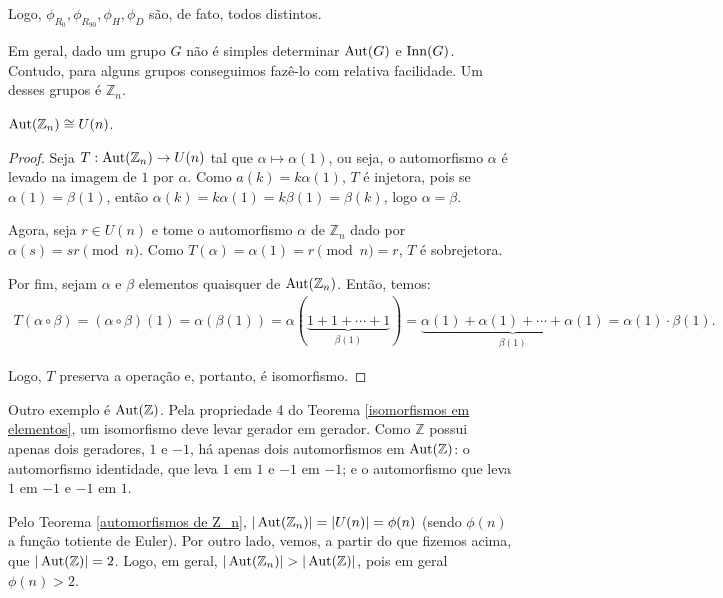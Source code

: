 	\par\vspace{0.3cm} Logo, $\phi_{R_0}, \phi_{R_{90}}, \phi_{H}, \phi_{D}$ são, de fato, todos distintos. 
	\par\vspace{0.3cm} Em geral, dado um grupo $G$ não é simples determinar $\operatorname{Aut}(G)$ e $\operatorname{Inn}(G)$. Contudo, para alguns grupos conseguimos fazê-lo com relativa facilidade. Um desses grupos é $\mathbb{Z}_n$.
	\begin{theorem}
		\label{automorfismos de Z_n}
		$\operatorname{Aut}(\mathbb{Z}_n) \cong U(n)$.
	\end{theorem}
	
	\begin{proof}
		Seja $T: \operatorname{Aut}(\mathbb{Z}_n)\to U(n)$ tal que $\alpha\mapsto\alpha(1)$, ou seja, o automorfismo $\alpha$ é levado na imagem de $1$ por $\alpha$. Como $a(k) = k\alpha(1)$, $T$ é injetora, pois se $\alpha(1) = \beta(1)$, então $\alpha(k) = k\alpha(1) = k\beta(1) = \beta(k)$, logo $\alpha = \beta$. 
		\par\vspace{0.3cm} Agora, seja $r\in U(n)$ e tome o automorfismo $\alpha$ de $\mathbb{Z}_n$ dado por $\alpha(s) = sr \pmod n$. Como $T(\alpha) = \alpha(1) = r\pmod n = r$, $T$ é sobrejetora.
		\par\vspace{0.3cm} Por fim, sejam $\alpha$ e $\beta$ elementos quaisquer de $\operatorname{Aut}(\mathbb{Z}_n)$. Então, temos:
		\begin{align*}
		T(\alpha\circ\beta) = (\alpha\circ\beta)(1) = \alpha(\beta(1)) = \alpha(\underbrace{1 + 1 + \cdots + 1}_{\beta(1)}) = \underbrace{\alpha(1) + \alpha(1) + \cdots + \alpha(1)}_{\beta(1)} = \alpha(1)\cdot\beta(1).
		\end{align*}
		\par\vspace{0.3cm} Logo, $T$ preserva a operação e, portanto, é isomorfismo.
	\end{proof}
	\par\vspace{0.3cm} Outro exemplo é $\operatorname{Aut}(\mathbb{Z})$.	Pela propriedade 4 do Teorema \eqref{isomorfismos em elementos}, um isomorfismo deve levar gerador em gerador. Como $\mathbb{Z}$ possui apenas dois geradores, $1$ e $-1$, há apenas dois automorfismos em $\operatorname{Aut}(\mathbb{Z})$: o automorfismo identidade, que leva $1$ em $1$ e $-1$ em $-1$; e o automorfismo que leva $1$ em $-1$ e $-1$ em $1$.
	
	
	\begin{remark}
		Pelo Teorema \eqref{automorfismos de Z_n}, $|\operatorname{Aut}(\mathbb{Z}_n)| = |U(n)| = \phi(n)$ (sendo $\phi(n)$ a função totiente de Euler). Por outro lado, vemos, a partir do que fizemos acima, que $|\operatorname{Aut}(\mathbb{Z})| = 2$. Logo, em geral, $|\operatorname{Aut}(\mathbb{Z}_n)| > |\operatorname{Aut}(\mathbb{Z})|$, pois em geral $\phi(n) > 2$.
	\end{remark}

